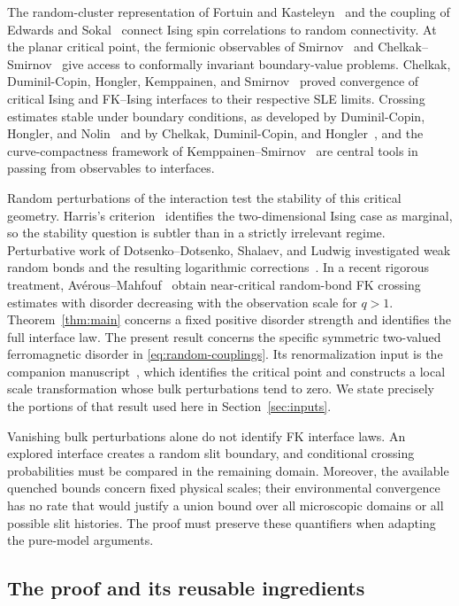 The random-cluster representation of Fortuin and Kasteleyn~\cite{FK} and
the coupling of Edwards and Sokal~\cite{ES} connect Ising spin correlations
to random connectivity. At the planar critical point, the fermionic
observables of Smirnov~\cite{Smirnov} and Chelkak--Smirnov~\cite{CS}
give access to conformally invariant boundary-value problems.
Chelkak, Duminil-Copin, Hongler, Kemppainen, and Smirnov~\cite{CDHKS}
proved convergence of critical Ising and FK--Ising interfaces to their
respective SLE limits. Crossing estimates stable under boundary conditions,
as developed by Duminil-Copin, Hongler, and Nolin~\cite{DCHN} and by
Chelkak, Duminil-Copin, and Hongler~\cite{CDH}, and the
curve-compactness framework of Kemppainen--Smirnov~\cite{KS} are central
tools in passing from observables to interfaces.

Random perturbations of the interaction test the stability of this critical
geometry. Harris's criterion~\cite{Harris} identifies the two-dimensional
Ising case as marginal, so the stability question is subtler than in a
strictly irrelevant regime. Perturbative work of Dotsenko--Dotsenko,
Shalaev, and Ludwig investigated weak random bonds and the resulting
logarithmic corrections~\cite{DD,Shalaev,Ludwig,LudwigCorrelations}.
In a recent rigorous treatment, Av\'erous--Mahfouf~\cite{AM} obtain
near-critical random-bond FK crossing estimates with disorder decreasing
with the observation scale for $q>1$. Theorem~\ref{thm:main} concerns a
fixed positive disorder strength and identifies the full interface law.
The present result concerns the specific
symmetric two-valued ferromagnetic disorder in \eqref{eq:random-couplings}.
Its renormalization input is the companion manuscript~\cite{Q}, which
identifies the critical point and constructs a local scale transformation
whose bulk perturbations tend to zero. We state precisely the portions of
that result used here in Section~\ref{sec:inputs}.

Vanishing bulk perturbations alone do not identify FK interface laws.
An explored interface creates a random slit boundary, and conditional
crossing probabilities must be compared in the remaining domain. Moreover,
the available quenched bounds concern fixed physical scales; their
environmental convergence has no rate that would justify a union bound
over all microscopic domains or all possible slit histories. The proof
must preserve these quantifiers when adapting the pure-model arguments.

\subsection{The proof and its reusable ingredients}

